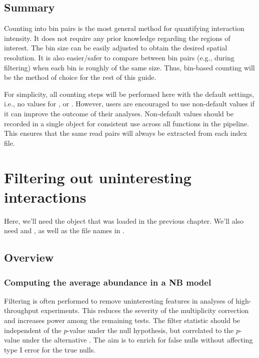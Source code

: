 \documentclass{report}\usepackage[]{graphicx}\usepackage[usenames,dvipsnames]{color}
\newenvironment{combox}
{ \definecolor{shadecolor}{RGB}{255, 240, 240} \begin{shaded}\begin{center}\begin{minipage}[t]{0.95\textwidth} }
{ \end{minipage}\end{center}\end{shaded} \definecolor{shadecolor}{RGB}{240,240,240} }
\begin{document}
\section{Summary}
Counting into bin pairs is the most general method for quantifying interaction intensity.
It does not require any prior knowledge regarding the regions of interest.
The bin size can be easily adjusted to obtain the desired spatial resolution.
It is also easier/safer to compare between bin pairs (e.g., during filtering) when each bin is roughly of the same size.
Thus, bin-based counting will be the method of choice for the rest of this guide.

For simplicity, all counting steps will be performed here with the default settings, i.e., no values for ,  or .
However, users are encouraged to use non-default values if it can improve the outcome of their analyses.
Non-default values should be recorded in a single  object for consistent use across all functions in the  pipeline.
This ensures that the same read pairs will always be extracted from each index file.

\chapter{Filtering out uninteresting interactions}
\label{chap:filter}

\begin{combox}
Here, we'll need the  object that was loaded in the previous chapter.
We'll also need  and , as well as the file names in .
\end{combox}

\section{Overview}

\subsection{Computing the average abundance in a NB model}
Filtering is often performed to remove uninteresting features in analyses of high-throughput experiments. 
This reduces the severity of the multiplicity correction and increases power among the remaining tests. 
The filter statistic should be independent of the $p$-value under the null hypothesis, but correlated to the $p$-value under the alternative \cite{bourgon2010independent}. 
The aim is to enrich for false nulls without affecting type I error for the true nulls.
\end{document}
